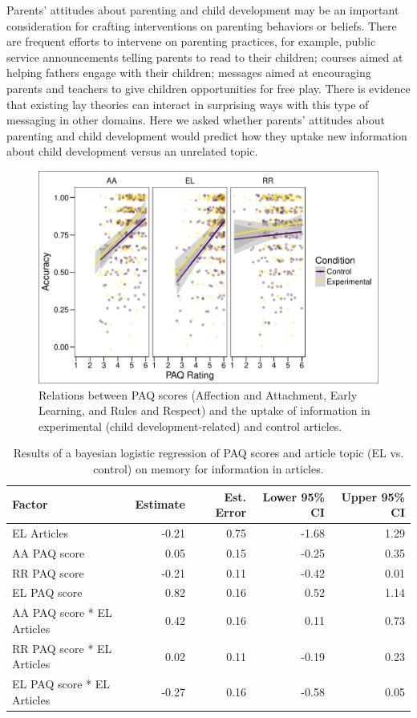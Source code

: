 \documentclass[floatsintext,man]{apa6}
\theoremstyle{definition}
\theoremstyle{definition}
\theoremstyle{definition}
\theoremstyle{remark}
\begin{document}
Parents' attitudes about parenting and child development may be an
important consideration for crafting interventions on parenting
behaviors or beliefs. There are frequent efforts to intervene on
parenting practices, for example, public service announcements telling
parents to read to their children; courses aimed at helping fathers
engage with their children; messages aimed at encouraging parents and
teachers to give children opportunities for free play. There is evidence
that existing lay theories can interact in surprising ways with this
type of messaging in other domains. Here we asked whether parents'
attitudes about parenting and child development would predict how they
uptake new information about child development versus an unrelated
topic.

\begin{figure}
\centering
\includegraphics{PAQ_paper_files/figure-latex/uptake-1.pdf}
\caption{\label{fig:uptake}Relations between PAQ scores (Affection and
Attachment, Early Learning, and Rules and Respect) and the uptake of
information in experimental (child development-related) and control
articles.}
\end{figure}

\begin{table}[h]
\centering
\caption{Results of a bayesian logistic regression of PAQ scores and article topic (EL vs. control) on memory for information in articles.} 
\label{tab:uptake}
\begin{tabular}{lrrrr}
  \hline
Factor & Estimate & Est. Error & Lower 95\% CI & Upper 95\% CI \\ 
  \hline
EL Articles & -0.21 & 0.75 & -1.68 & 1.29 \\ 
  AA PAQ score & 0.05 & 0.15 & -0.25 & 0.35 \\ 
  RR PAQ score & -0.21 & 0.11 & -0.42 & 0.01 \\ 
  EL PAQ score & 0.82 & 0.16 & 0.52 & 1.14 \\ 
  AA PAQ score * EL Articles & 0.42 & 0.16 & 0.11 & 0.73 \\ 
  RR PAQ score * EL Articles & 0.02 & 0.11 & -0.19 & 0.23 \\ 
  EL PAQ score * EL Articles & -0.27 & 0.16 & -0.58 & 0.05 \\ 
   \hline
\end{tabular}
\end{table}
\end{document}
